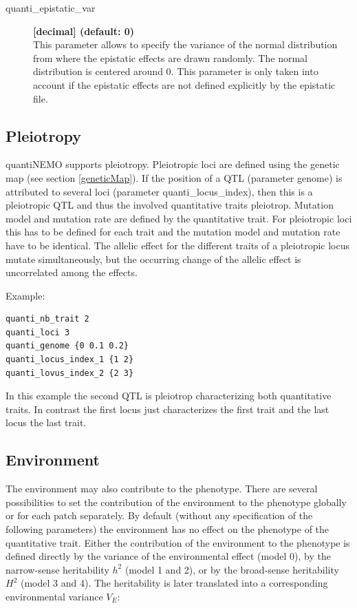 \documentclass[letterpaper,12pt,oneside]{book}
\begin{document}
\begin{description}
\item[quanti\_epistatic\_var] \textbf{[decimal] (default: 0)} \\
This parameter allows to specify the variance of the normal distribution from where the epistatic effects are drawn randomly. The normal distribution is centered around 0. This parameter is only taken into account if the epistatic effects are not defined explicitly by the epistatic file.
\end{description}




\subsection{Pleiotropy}\label{pleiotropy}
quantiNEMO supports pleiotropy. Pleiotropic loci are defined using the genetic map (see section \ref{geneticMap}). If the position of a QTL (parameter \textsf{genome}) is attributed to several loci (parameter  \textsf{quanti\_locus\_index}), then this is a pleiotropic QTL and thus the involved quantitative traits pleiotrop. Mutation model and mutation rate are defined by the quantitative trait. For pleiotropic loci this has to be defined for each trait and the mutation model and mutation rate have to be identical. The allelic effect for the different traits of a pleiotropic locus mutate simultaneously, but the occurring change of the allelic effect is uncorrelated among the effects.

Example:
\begin{lstlisting}[frame=single]
quanti_nb_trait 2
quanti_loci 3	
quanti_genome {0 0.1 0.2}		 
quanti_locus_index_1 {1 2}
quanti_lovus_index_2 {2 3}
\end{lstlisting}
In this example the second QTL is pleiotrop characterizing both quantitative traits. In contrast the first locus just characterizes the first trait and the last locus the last trait. 




\subsection{Environment}
The environment may also contribute to the phenotype. There are several possibilities to set the contribution of the environment to the phenotype globally or for each patch separately. By default (without any specification of the following parameters) the environment has no effect on the phenotype of the quantitative trait. Either the contribution of the environment to the phenotype is defined directly by the variance of the environmental effect (model 0), by the narrow-sense heritability $h^{2}$ (model 1 and 2), or by the broad-sense heritability $H^{2}$ (model 3 and 4). The heritability is later translated into a corresponding environmental variance $V_{E}$: 
\end{document}
